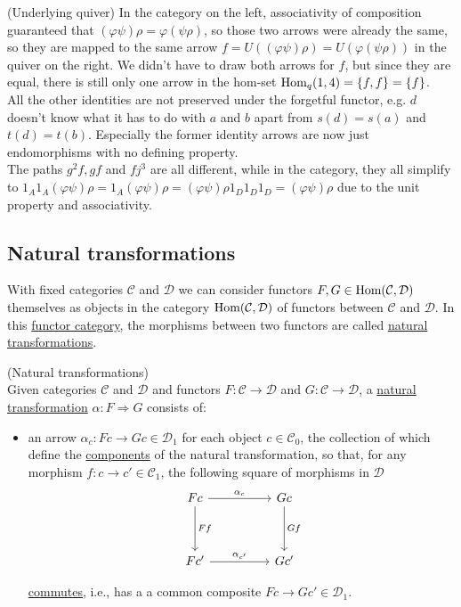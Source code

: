 \begin{example}{(Underlying quiver)}
\noindent In the category on the left, associativity of composition guaranteed that $(\varphi\psi)\rho = \varphi(\psi\rho)$, so those two arrows
were already the same, so they are mapped to the same arrow $f = U((\varphi\psi)\rho) = U(\varphi(\psi\rho))$ in the quiver on the right.
We didn't have to draw both arrows for $f$, but since they are equal, there is still only one arrow in the hom-set $\textup{Hom}_{q}(1,4)=\{f,f\} = \{f\}$.\\
All the other identities are not preserved under the forgetful functor, e.g. $d$ doesn't know what it has to do with $a$ and $b$ apart from
$s(d) = s(a)$ and $t(d) = t(b)$. Especially the former identity arrows are now just endomorphisms with no defining property.\\
The paths $g^{2}f, gf$ and $fj^{3}$ are all different, while in the category, they all simplify to
$1_{A}1_{A}(\varphi\psi)\rho = 1_{A}(\varphi\psi)\rho = (\varphi\psi)\rho1_{D}1_{D}1_{D} =  (\varphi\psi)\rho$ due to the unit property and associativity.
\end{example}


\subsection{Natural transformations}

With fixed categories $\mathcal{C}$ and $\mathcal{D}$ we can consider functors $F, G \in \textup{Hom}(\mathcal{C},\mathcal{D})$ themselves
as objects in the category $\textup{Hom}(\mathcal{C},\mathcal{D})$ of functors between $\mathcal{C}$ and $\mathcal{D}$. In this \ul{functor category},
the morphisms between two functors are called \ul{natural transformations}.

\begin{definition}{(Natural transformations)}\label{def:natural_transformation}\\
\noindent Given categories $\mathcal{C}$ and $\mathcal{D}$ and functors $F : \mathcal{C} \rightarrow \mathcal{D}$ and
$G : \mathcal{C} \rightarrow \mathcal{D}$, a \ul{natural transformation} $\alpha : F \Rightarrow G$ consists of:
\begin{itemize}
\item an arrow $\alpha_{c} : Fc \rightarrow Gc \in \mathcal{D}_{1}$ for each object $c \in \mathcal{C}_{0}$, the collection of which
define the \ul{components} of the natural transformation, so that, for any morphism $f : c \rightarrow c' \in \mathcal{C}_{1}$, the following
square of morphisms in $\mathcal{D}$
\[\begin{tikzcd}
Fc \arrow[rr, "\alpha_{c}"] \arrow[dd, "Ff"] &  & Gc \arrow[dd, "Gf"] \\
                                             &  &                     \\
Fc' \arrow[rr, "\alpha_{c'}"]                &  & Gc'                
\end{tikzcd}\]

\ul{commutes}, i.e., has a a common composite $Fc \rightarrow Gc' \in \mathcal{D}_{1}$.
\end{itemize}

\end{definition}

